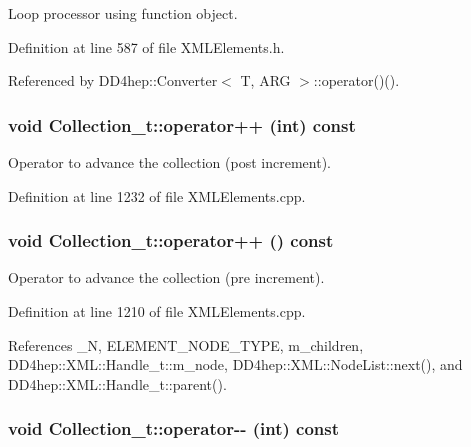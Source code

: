 Loop processor using function object. 

Definition at line 587 of file XMLElements.h.

Referenced by DD4hep::Converter$<$ T, ARG $>$::operator()().\hypertarget{class_d_d4hep_1_1_x_m_l_1_1_collection__t_ab802a42886a5241fc465a1660d628d5a}{
\subsubsection[{operator++}]{\setlength{\rightskip}{0pt plus 5cm}void Collection\_\-t::operator++ (int) const}}
\label{class_d_d4hep_1_1_x_m_l_1_1_collection__t_ab802a42886a5241fc465a1660d628d5a}


Operator to advance the collection (post increment). 

Definition at line 1232 of file XMLElements.cpp.\hypertarget{class_d_d4hep_1_1_x_m_l_1_1_collection__t_afba24ece49cd00ba1ba295114c5b0d0a}{
\subsubsection[{operator++}]{\setlength{\rightskip}{0pt plus 5cm}void Collection\_\-t::operator++ () const}}
\label{class_d_d4hep_1_1_x_m_l_1_1_collection__t_afba24ece49cd00ba1ba295114c5b0d0a}


Operator to advance the collection (pre increment). 

Definition at line 1210 of file XMLElements.cpp.

References \_\-N, ELEMENT\_\-NODE\_\-TYPE, m\_\-children, DD4hep::XML::Handle\_\-t::m\_\-node, DD4hep::XML::NodeList::next(), and DD4hep::XML::Handle\_\-t::parent().\hypertarget{class_d_d4hep_1_1_x_m_l_1_1_collection__t_a7a5be60ec38895f011cee2c3feb038c4}{
\subsubsection[{operator-\/-\/}]{\setlength{\rightskip}{0pt plus 5cm}void Collection\_\-t::operator-\/-\/ (int) const}}
\label{class_d_d4hep_1_1_x_m_l_1_1_collection__t_a7a5be60ec38895f011cee2c3feb038c4}


